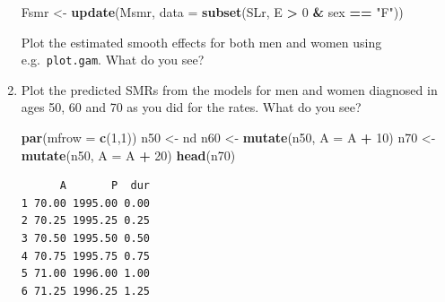 \documentclass[
]{book}
\newenvironment{Shaded}{\begin{snugshade}}{\end{snugshade}}
\newcommand{\AttributeTok}[1]{\textcolor[rgb]{0.13,0.29,0.53}{#1}}
\newcommand{\DecValTok}[1]{\textcolor[rgb]{0.00,0.00,0.81}{#1}}
\newcommand{\FunctionTok}[1]{\textcolor[rgb]{0.13,0.29,0.53}{\textbf{#1}}}
\newcommand{\NormalTok}[1]{#1}
\newcommand{\OtherTok}[1]{\textcolor[rgb]{0.56,0.35,0.01}{#1}}
\newcommand{\SpecialCharTok}[1]{\textcolor[rgb]{0.81,0.36,0.00}{\textbf{#1}}}
\newcommand{\StringTok}[1]{\textcolor[rgb]{0.31,0.60,0.02}{#1}}
\begin{document}
\begin{enumerate}
\begin{Shaded}
\begin{Highlighting}[]
\NormalTok{Fsmr }\OtherTok{\textless{}{-}} \FunctionTok{update}\NormalTok{(Msmr, }\AttributeTok{data =} \FunctionTok{subset}\NormalTok{(SLr, E }\SpecialCharTok{\textgreater{}} \DecValTok{0} \SpecialCharTok{\&}\NormalTok{ sex }\SpecialCharTok{==} \StringTok{"F"}\NormalTok{))}
\end{Highlighting}
\end{Shaded}

  Plot the estimated smooth effects for both men and women using
  e.g.~\texttt{plot.gam}. What do you see?
\item
  Plot the predicted SMRs from the models for men and women
  diagnosed in ages 50, 60 and 70 as you did for the rates. What do
  you see?

\begin{Shaded}
\begin{Highlighting}[]
\FunctionTok{par}\NormalTok{(}\AttributeTok{mfrow =} \FunctionTok{c}\NormalTok{(}\DecValTok{1}\NormalTok{,}\DecValTok{1}\NormalTok{))}
\NormalTok{n50 }\OtherTok{\textless{}{-}}\NormalTok{ nd}
\NormalTok{n60 }\OtherTok{\textless{}{-}} \FunctionTok{mutate}\NormalTok{(n50, }\AttributeTok{A =}\NormalTok{ A }\SpecialCharTok{+} \DecValTok{10}\NormalTok{)}
\NormalTok{n70 }\OtherTok{\textless{}{-}} \FunctionTok{mutate}\NormalTok{(n50, }\AttributeTok{A =}\NormalTok{ A }\SpecialCharTok{+} \DecValTok{20}\NormalTok{)}
\FunctionTok{head}\NormalTok{(n70)}
\end{Highlighting}
\end{Shaded}

\begin{verbatim}
      A       P  dur
1 70.00 1995.00 0.00
2 70.25 1995.25 0.25
3 70.50 1995.50 0.50
4 70.75 1995.75 0.75
5 71.00 1996.00 1.00
6 71.25 1996.25 1.25
\end{verbatim}


\end{enumerate}
\end{document}
